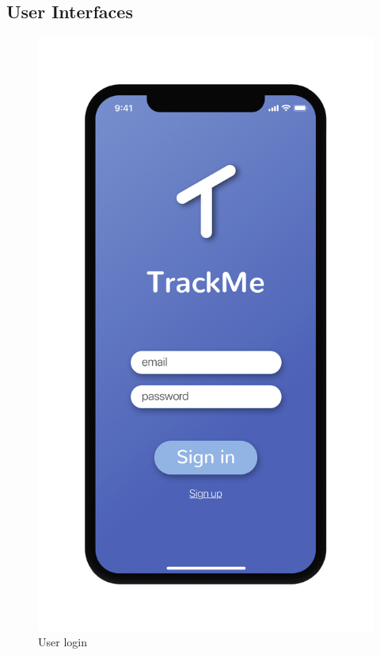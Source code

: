 \subsection{User Interfaces}

\begin{figure}[H]
\includegraphics[scale=0.1,keepaspectratio]{rasdL/Pictures/Mockup/mobile/login.png}
\centering
\captionsetup{labelformat=simple}
\caption{User login}
\end{figure}



